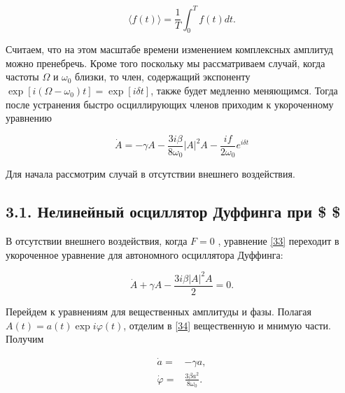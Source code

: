 \documentclass[11pt]{article}
\begin{document}
\begin{equation}
\langle f(t)\rangle=\frac{1}{T} \int_{0}^{T} f(t) d t.
\end{equation}

Считаем, что на этом масштабе времени изменением комплексных амплитуд
можно пренебречь. Кроме того поскольку мы рассматриваем случай, когда
частоты \(\Omega\) и \(\omega_0\) близки, то член, содержащий экспоненту
\(\exp \left[i\left(\Omega-\omega_{0}\right) t\right]=\exp [i \delta t]\),
также будет медленно меняющимся. Тогда после устранения быстро
осциллирующих членов приходим к укороченному уравнению

\begin{equation}
\label{33}
\dot{A}=-\gamma A-\frac{3 i \beta}{8 \omega_{0}}|A|^{2} A-\frac{i f}{2 \omega_{0}} e^{i \delta t}
\end{equation}

Для начала рассмотрим случай в отсутствии внешнего воздействия.

\hypertarget{ux43dux435ux43bux438ux43dux435ux439ux43dux44bux439-ux43eux441ux446ux438ux43bux43bux44fux442ux43eux440-ux434ux443ux444ux444ux438ux43dux433ux430-ux43fux440ux438}{%
\subsection{\texorpdfstring{3.1. Нелинейный осциллятор Дуффинга при \$
\$}{3.1. Нелинейный осциллятор Дуффинга при \$ \$}}\label{ux43dux435ux43bux438ux43dux435ux439ux43dux44bux439-ux43eux441ux446ux438ux43bux43bux44fux442ux43eux440-ux434ux443ux444ux444ux438ux43dux433ux430-ux43fux440ux438}}

В отсутствии внешнего воздействия, когда \(F = 0\) , уравнение
\eqref{33} переходит в укороченное уравнение для автономного осциллятора
Дуффинга:

\begin{equation}
\label{34}
\dot{A}+\gamma A-\frac{3 i \beta|A|^{2} A}{2}=0.
\end{equation}

Перейдем к уравнениям для вещественных амплитуды и фазы. Полагая
\(A(t) = a(t) \exp{i \varphi(t)}\), отделим в \eqref{34} вещественную и
мнимую части. Получим

\begin{equation}
\label{35}
\begin{aligned}
\dot{a} =& - \gamma a,  \\
\dot{\varphi} =& \frac{3 \beta a^{2}}{8 \omega_{0}}.
\end{aligned}
\end{equation}
\end{document}
